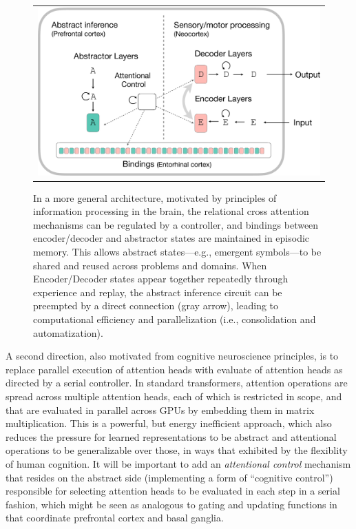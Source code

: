 \begin{figure}[t]
    \vspace{-3mm}
    \begin{center}
    \begin{tabular}{c}
        \hskip2pt\includegraphics[width=.60\textwidth]{figures/algorithm-diagram2-crop} 
    \end{tabular}
    \caption{In a more general architecture, motivated by principles of information processing 
    in the brain, the relational cross attention mechanisms can be regulated by a controller, and bindings between encoder/decoder and abstractor states are maintained in episodic memory. This allows abstract states---e.g., emergent symbols---to be shared and reused across problems and domains. When Encoder/Decoder states appear together repeatedly through experience and replay, the abstract inference circuit can be preempted by a direct connection (gray arrow), leading to computational efficiency and parallelization (i.e., consolidation and automatization).
    }
    \label{fig:algo2}
    \vskip-12pt
    \end{center}
\end{figure}

A second direction, also motivated from cognitive neuroscience principles, is to replace 
parallel execution of attention heads with evaluate of attention heads as directed by a serial controller. 
In standard transformers, attention operations are spread across multiple attention heads,
each of which is restricted in scope, and that are evaluated in parallel across GPUs by embedding them in matrix multiplication. This is a powerful, but energy inefficient approach, which also reduces the pressure for learned representations to be abstract and attentional operations to be generalizable over those, in ways that exhibited by the flexiblity of human cognition.  It will be important to add an {\it attentional control} mechanism that resides on the abstract side (implementing a form of ``cognitive control'') responsible for selecting attention heads to be evaluated in each step in a serial fashion, which might be seen as analogous to gating and updating functions 
in that coordinate prefrontal cortex and basal ganglia.

